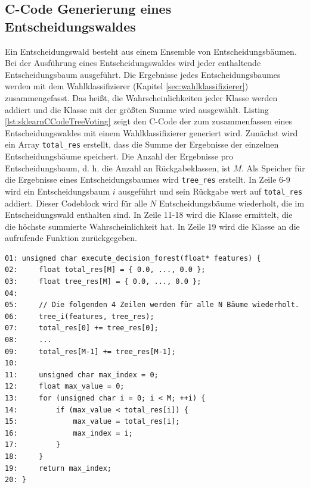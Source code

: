 \subsection{C-Code Generierung eines Entscheidungswaldes}
Ein Entscheidungswald besteht aus einem Ensemble von Entscheidungsbäumen. Bei der Ausführung eines Entscheidungswaldes wird jeder enthaltende Entscheidungsbaum ausgeführt. Die Ergebnisse jedes
Entscheidungsbaumes werden mit dem Wahlklassifizierer (Kapitel \ref{sec:wahlklassifizierer}) zusammengefasst. Das heißt, die Wahrscheinlichkeiten jeder Klasse werden addiert und die Klasse mit
der größten Summe wird ausgewählt.
\newline
\newline
Listing \ref{lst:sklearnCCodeTreeVoting} zeigt den C-Code der zum zusammenfassen eines Entscheidungswaldes mit einem Wahlklassifizierer generiert wird. Zunächst wird ein
Array \texttt{total\_res} erstellt, dass die Summe der Ergebnisse der einzelnen Entscheidungsbäume speichert. Die Anzahl der Ergebnisse pro Entscheidungsbaum, d. h. die Anzahl an Rückgabeklassen, ist $M$.
Als Speicher für die Ergebnisse eines Entscheidungsbaumes wird \texttt{tree\_res} erstellt. In Zeile 6-9 wird ein Entscheidungsbaum $i$ ausgeführt und sein Rückgabe wert auf \texttt{total\_res} addiert.
Dieser Codeblock wird für alle $N$ Entscheidungsbäume wiederholt, die im Entscheidungswald enthalten sind. In Zeile 11-18 wird die Klasse ermittelt, die die höchste summierte Wahrscheinlichkeit hat.
In Zeile 19 wird die Klasse an die aufrufende Funktion zurückgegeben.
\begin{lstlisting}[label=lst:sklearnCCodeTreeVoting,caption={C-Code des Wahlklassifizierers mit $M$ Klassen und $N$ Bäumen.}]
01: unsigned char execute_decision_forest(float* features) {
02:     float total_res[M] = { 0.0, ..., 0.0 };
03:     float tree_res[M] = { 0.0, ..., 0.0 };
04:
05:     // Die folgenden 4 Zeilen werden für alle N Bäume wiederholt.
06:     tree_i(features, tree_res);
07:     total_res[0] += tree_res[0];
08:     ...
09:     total_res[M-1] += tree_res[M-1];
10:
11:     unsigned char max_index = 0;
12:     float max_value = 0;
13:     for (unsigned char i = 0; i < M; ++i) {
14:         if (max_value < total_res[i]) {
15:             max_value = total_res[i];
16:             max_index = i;
17:         }
18:     }
19:     return max_index;
20: }
\end{lstlisting}